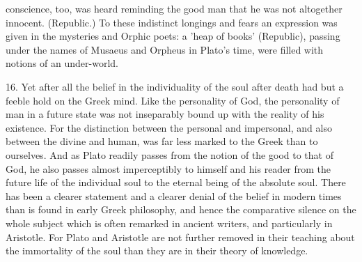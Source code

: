 \documentclass[11pt,letter]{article}
\begin{document}
conscience, too, was heard reminding the good man that he was not altogether innocent. (Republic.) To these indistinct longings and fears an expression was given in the mysteries and Orphic poets: a 'heap of books' (Republic), passing under the names of Musaeus and Orpheus in Plato's time, were filled with notions of an under-world.

\par  16. Yet after all the belief in the individuality of the soul after death had but a feeble hold on the Greek mind. Like the personality of God, the personality of man in a future state was not inseparably bound up with the reality of his existence. For the distinction between the personal and impersonal, and also between the divine and human, was far less marked to the Greek than to ourselves. And as Plato readily passes from the notion of the good to that of God, he also passes almost imperceptibly to himself and his reader from the future life of the individual soul to the eternal being of the absolute soul. There has been a clearer statement and a clearer denial of the belief in modern times than is found in early Greek philosophy, and hence the comparative silence on the whole subject which is often remarked in ancient writers, and particularly in Aristotle. For Plato and Aristotle are not further removed in their teaching about the immortality of the soul than they are in their theory of knowledge.
\end{document}
